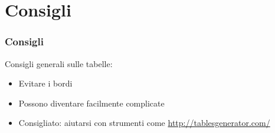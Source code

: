 \section{Consigli}
\begin{frame}
 
 \frametitle{Consigli}
 
 Consigli generali sulle tabelle:
 \begin{itemize}
  \item Evitare i bordi
  \item Possono diventare facilmente complicate
  \item Consigliato: aiutarsi con strumenti come 
\url{http://tablesgenerator.com/}
 \end{itemize}

\end{frame}
